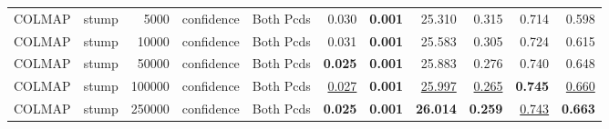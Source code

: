 \begin{table}[H]
\begin{tabular}{llrllrrrrrr}
COLMAP & stump & 5000 & confidence & Both Pcds & 0.030 & \textbf{0.001} & 25.310 & 0.315 & 0.714 & 0.598 \\
COLMAP & stump & 10000 & confidence & Both Pcds & 0.031 & \textbf{0.001} & 25.583 & 0.305 & 0.724 & 0.615 \\
COLMAP & stump & 50000 & confidence & Both Pcds & \textbf{0.025} & \textbf{0.001} & 25.883 & 0.276 & 0.740 & 0.648 \\
COLMAP & stump & 100000 & confidence & Both Pcds & \underline{0.027} & \textbf{0.001} & \underline{25.997} & \underline{0.265} & \textbf{0.745} & \underline{0.660} \\
COLMAP & stump & 250000 & confidence & Both Pcds & \textbf{0.025} & \textbf{0.001} & \textbf{26.014} & \textbf{0.259} & \underline{0.743} & \textbf{0.663} \\
\bottomrule
\end{tabular}
\end{table}
